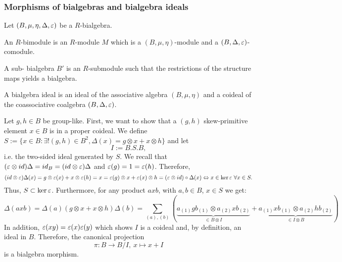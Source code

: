\subsubsection{Morphisms of bialgebras and bialgebra ideals}
\begin{defi}
Let $(B,\mu,\eta,\Delta,\varepsilon)$ be a $R$-bialgebra.
\bn
\item An $R$-bimodule is an $R$-module $M$ which is a $(B,\mu,\eta)$-module and a $(B,\Delta,\varepsilon)$-comodule.
\item A sub- bialgebra $B'$ is an $R$-submodule such that the restrictions of the structure maps yields a bialgebra.
\item A bialgebra ideal is an ideal of the associative algebra $(B,\mu,\eta)$ and a coideal of the coassociative coalgebra $(B,\Delta,\varepsilon)$.
\en
{}
\end{defi}
\bmk Let $g, h \in B$ be group-like. First, we want to show that a $(g,h)$ skew-primitive element $x \in B$ is in a proper coideal. We define $S := \{x \in B : \exists! (g, h) \in B^2, \Delta(x) = g \otimes x + x \otimes h\}$ and let
$$I := B.S.B,$$
i.e. the two-sided ideal generated by $S$. We recall that $(\varepsilon\otimes id)\Delta = id_B = (id\otimes \varepsilon)\Delta$ and $\varepsilon(g) = 1 = \varepsilon(h)$. Therefore,
$$(id\otimes \varepsilon)\Delta(x) = g \otimes \varepsilon(x) + x \otimes \varepsilon(h) = x = \varepsilon(g) \otimes x + \varepsilon(x) \otimes h = (\varepsilon \otimes id) \circ \Delta(x) \Leftrightarrow x \in \ker \varepsilon\ \forall x \in S.$$
Thus, $S \subset \ker \varepsilon$. Furthermore, for any product $a x b$, with $a, b \in B$, $x \in S$ we get:
$$\Delta(a x b) = \Delta(a) (g \otimes x + x \otimes h) \Delta(b) = \sum_{(a),(b)} (\underbrace{a_{(1)} g b_{(1)} \otimes a_{(2)} x b_{(2)}}_{\in B \otimes I} + \underbrace{a_{(1)} x b_{(1)} \otimes a_{(2)} h b_{(2)}}_{\in I \otimes B})$$
In addition, $\varepsilon(x y) = \varepsilon(x) \varepsilon(y)$ which shows $I$ is a coideal and, by definition, an ideal in $B$. Therefore, the canonical projection
$$\pi : B \longrightarrow B/I,\ x \longmapsto x + I$$
is a bialgebra morphism.\\
